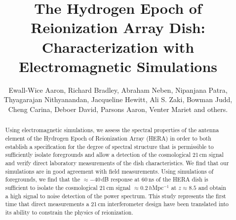\documentclass[twocolumn]{emulateapj}
\begin{document}
\title{The Hydrogen Epoch of Reionization Array Dish: Characterization with Electromagnetic Simulations}
\author{
Ewall-Wice Aaron,
Richard Bradley,
Abraham Neben,
Nipanjana Patra,
Thyagarajan Nithyanandan,
Jacqueline Hewitt,
Ali S. Zaki,
Bowman Judd,
Cheng Carina,
Deboer David,
Parsons Aaron,
Venter Mariet
and others.
}

\begin{abstract}
Using electromagnetic simulations, we assess the spectral properties of the antenna element of the Hydrogen Epoch of Reionization Array (HERA) in order to both establish a specification for the degree of spectral structure that is permissible to sufficiently isolate foregrounds and allow a detection of the cosmological 21\,cm signal and verify direct laboratory measurements of the dish characteristics. We find that our simulations are in good agreement with field measurements. Using simulations of foregrounds, we find that the $\approx -40$\,dB response at 60\,ns of the HERA dish is sufficient to isolate the cosmological 21\,cm signal $\approx 0.2$\,$h$Mpc$^{-1}$ at $z\approx 8.5$ and obtain a high signal to noise detection of the power spectrum. This study represents the first time that direct measurements a 21\,cm interferometer design have been translated into its ability to constrain the physics of reionization. 
\end{abstract}
\end{document}
